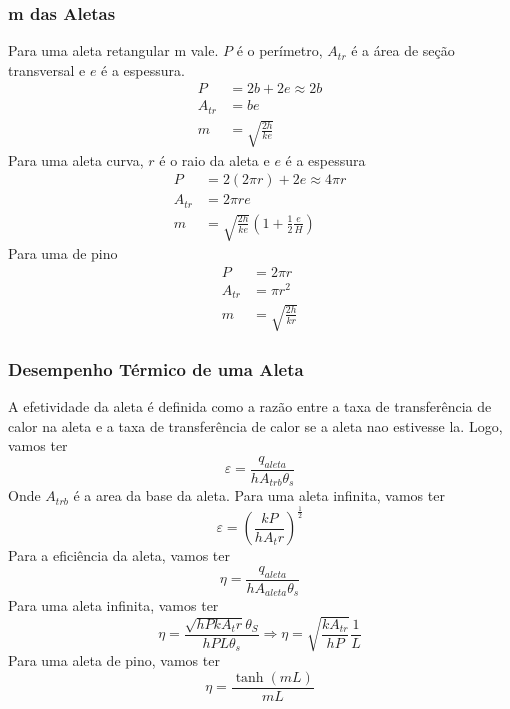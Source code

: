 \subsubsection{m das Aletas}
Para uma aleta retangular m vale. \(P\)  é o perímetro, \(A_{tr} \) é a área de seção transversal e
\(e\) é a espessura.
\begin{align}
    P &= 2b + 2e \approx 2b\\
    A_{tr} &= be\\
    m &= \sqrt{\frac{2h}{ke}}
\end{align}
Para uma aleta curva, \(r\) é o raio da aleta e \(e\) é a espessura
\begin{align}
    P &= 2(2\pi r) + 2e \approx 4\pi r\\
    A_{tr} &= 2\pi r e\\
    m &= \sqrt{\frac{2h}{ke}} \left(1 + \frac{1}{2} \frac{e}{H} \right)
\end{align}
Para uma de pino
\begin{align}
    P &= 2\pi r\\
    A_{tr} &= \pi r^2\\
    m &= \sqrt{\frac{2h}{kr}}
\end{align}
\subsubsection{Desempenho Térmico de uma Aleta}
A efetividade da aleta é definida como a razão entre a taxa de transferência de calor na aleta e a
taxa de transferência de calor se a aleta nao estivesse la. Logo, vamos ter
\begin{equation}
    \varepsilon = \frac{q_{aleta}}{h A_{trb} \theta_s}
\end{equation}
Onde \(A_{trb}\) é a area da base da aleta. Para uma aleta infinita, vamos ter
\begin{equation}
    \varepsilon = \left(\frac{kP}{h A_tr}\right)^{\frac{1}{2}}
\end{equation}
Para a eficiência da aleta, vamos ter
\begin{equation}
    \eta = \frac{q_{aleta}}{h A_{aleta}\theta_s}
\end{equation}
Para uma aleta infinita, vamos ter
\begin{equation}
    \eta = \frac{\sqrt{hPkA_tr}\theta_S}{hPL\theta_s} \Rightarrow \eta = \sqrt{\frac{kA_{tr}}{hP}} \frac{1}{L}
\end{equation}
Para uma aleta de pino, vamos ter
\begin{equation}
    \eta = \frac{\tanh\left(mL\right)}{mL} 
\end{equation}
